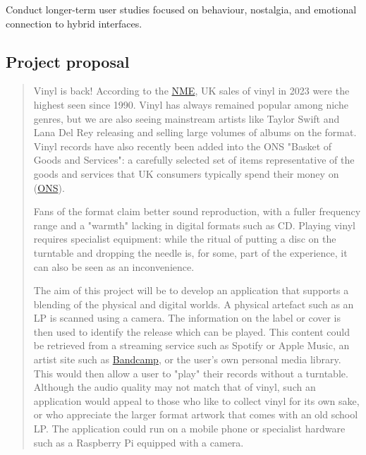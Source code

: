            Conduct longer-term user studies focused on behaviour, nostalgia, and emotional connection to hybrid interfaces.
    
    \printbibliography[title={References},heading=bibintoc] %
    
    
    
    \begin{uomappendix} 
        \section{Project proposal}
    
            \begin{quote}
                Vinyl is back! According to the \href{https://www.nme.com/news/music/uk-vinyl-sales-2023-reach-highest-level-since-1990-3563676}{NME}, UK sales of vinyl in 2023 were the highest seen since 1990. Vinyl has always remained popular among niche genres, but we are also seeing mainstream artists like Taylor Swift and Lana Del Rey releasing and selling large volumes of albums on the format. Vinyl records have also recently been added into the ONS "Basket of Goods and Services": a carefully selected set of items representative of the goods and services that UK consumers typically spend their money on (\href{https://www.ons.gov.uk/news/news/arecordrevivalthatscookingupastormvinylmusicandairfryersspintheirwayintothebasketofgoods}{ONS}).
                
                Fans of the format claim better sound reproduction, with a fuller frequency range and a "warmth" lacking in digital formats such as CD. Playing vinyl requires specialist equipment: while the ritual of putting a disc on the turntable and dropping the needle is, for some, part of the experience, it can also be seen as an inconvenience.
                
                The aim of this project will be to develop an application that supports a blending of the physical and digital worlds. A physical artefact such as an LP is scanned using a camera. The information on the label or cover is then used to identify the release which can be played. This content could be retrieved from a streaming service such as Spotify or Apple Music, an artist site such as \href{https://bandcamp.com/}{Bandcamp}, or the user's own personal media library. This would then allow a user to "play" their records without a turntable. Although the audio quality may not match that of vinyl, such an application would appeal to those who like to collect vinyl for its own sake, or who appreciate the larger format artwork that comes with an old school LP. The application could run on a mobile phone or specialist hardware such as a Raspberry Pi equipped with a camera.
                

\end{quote}
\end{uomappendix}
